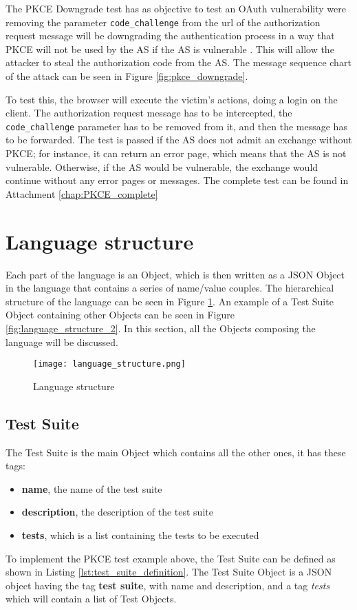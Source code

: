 The \gls{PKCE} Downgrade test has as objective to test an \gls{OAuth} vulnerability were removing the parameter \texttt{code\_challenge} from the url of the authorization request message will be downgrading the authentication process in a way that \gls{PKCE} will not be used by the AS if the AS is vulnerable \cite{pkce_downgrade}. This will allow the attacker to steal the authorization code from the AS. The message sequence chart of the attack can be seen in Figure \ref{fig:pkce_downgrade}.

To test this, the browser will execute the victim's actions, doing a login on the client. The authorization request message has to be intercepted, the \texttt{code\_challenge} parameter has to be removed from it, and then the message has to be forwarded. The test is passed if the AS does not admit an exchange without PKCE; for instance, it can return an error page, which means that the AS is not vulnerable. Otherwise, if the AS would be vulnerable, the exchange would continue without any error pages or messages.
The complete test can be found in Attachment \ref{chap:PKCE_complete}


\section{Language structure}
Each part of the language is an Object, which is then written as a JSON Object in the language that contains a series of name/value couples. The hierarchical structure of the language can be seen in Figure \ref{fig:language_structure}. An example of a Test Suite Object containing other Objects can be seen in Figure \ref{fig:language_structure_2}. In this section, all the Objects composing the language will be discussed.\\

\begin{figure}
    \texttt{[image: language\_structure.png]}
    \caption{Language structure}
    \label{fig:language_structure}
\end{figure}

\subsection{Test Suite}
The Test Suite is the main Object which contains all the other ones, it has these tags:

\begin{itemize}
    \item \textbf{name}, the name of the test suite
    \item \textbf{description}, the description of the test suite
    \item \textbf{tests}, which is a list containing the tests to be executed
\end{itemize}
To implement the \gls{PKCE} test example above, the Test Suite can be defined as shown in Listing \ref{lst:test_suite_definition}. The Test Suite Object is a JSON object having the tag \textbf{test suite}, with name and description, and a tag \textit{tests} which will contain a list of Test Objects.


